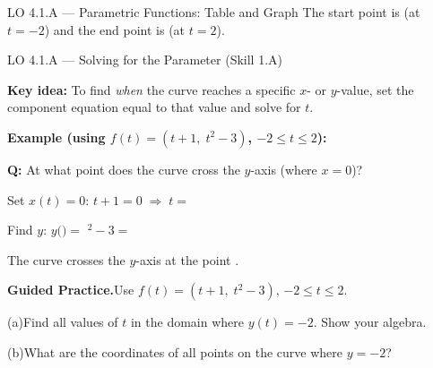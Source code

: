 \documentclass[10pt]{article}
\begin{document}
\begin{notesbox}{LO 4.1.A --- Parametric Functions: Table and Graph}
\vspace{4pt}
The start point is  (at $t = -2$) and the
end point is  (at $t = 2$).

\end{notesbox}

\vspace{0.08in}

\begin{notesbox}{LO 4.1.A --- Solving for the Parameter (Skill 1.A)}

\textbf{Key idea:} To find \emph{when} the curve reaches a specific
$x$- or $y$-value, set the component equation equal to that value and
solve for $t$.

\vspace{8pt}
\textbf{Example (using $f(t) = (t+1,\; t^2-3)$, $-2 \le t \le 2$):}

\vspace{4pt}
\textbf{Q:} At what point does the curve cross the $y$-axis
(where $x = 0$)?

Set $x(t) = 0$: \quad $t + 1 = 0 \;\Rightarrow\; t = $ 

Find $y$: \quad $y($$) = $ ${}^2 - 3 = $ 

The curve crosses the $y$-axis at the point .

\vspace{10pt}
\textbf{Guided Practice.}\quad Use $f(t) = (t+1,\; t^2-3)$,
$-2 \le t \le 2$.

\vspace{4pt}
(a)\quad Find all values of $t$ in the domain where $y(t) = -2$.
Show your algebra.


(b)\quad What are the coordinates of all points on the curve where
$y = -2$?


\end{notesbox}

\vspace{0.08in}
\end{document}
